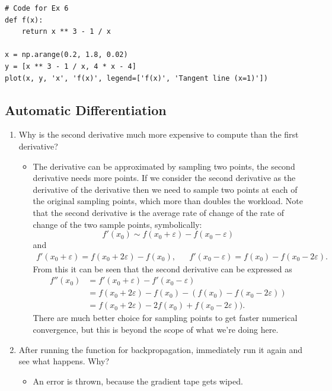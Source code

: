 \documentclass{article}
\begin{document}
\begin{verbatim}
# Code for Ex 6
def f(x):
    return x ** 3 - 1 / x

x = np.arange(0.2, 1.8, 0.02)
y = [x ** 3 - 1 / x, 4 * x - 4]
plot(x, y, 'x', 'f(x)', legend=['f(x)', 'Tangent line (x=1)'])
\end{verbatim}

\subsection{Automatic Differentiation}
\begin{enumerate}
\item Why is the second derivative much more expensive to compute than the first derivative?
	\begin{itemize}
		\item The derivative can be approximated by sampling two points, the second derivative needs more points. If we consider the second derivative as the derivative of the derivative then we need to sample two points at each of the original sampling points, which more than doubles the workload. Note that the second derivative is the average rate of change of the rate of change of the two sample points, symbolically:
		$$
		f'(x_0) \sim f(x_0 + \varepsilon) - f(x_0 - \varepsilon)
		$$
		and
		\begin{align*}
		f'(x_0 + \varepsilon) = f(x_0 + 2\varepsilon) - f(x_0),&&f'(x_0 - \varepsilon) = f(x_0) - f(x_0 - 2\varepsilon).
		\end{align*}
		From this it can be seen that the second derivative can be expressed as
		\begin{align*}
		f''(x_0) &= f'(x_0 + \varepsilon) - f'(x_0 - \varepsilon) \\
		&= f(x_0 + 2\varepsilon) - f(x_0) - (f(x_0) - f(x_0 - 2\varepsilon)) \\
		&= f(x_0 + 2\varepsilon) - 2f(x_0) + f(x_0 - 2\varepsilon)).
		\end{align*}
		There are much better choice for sampling points to get faster numerical convergence, but this is beyond the scope of what we're doing here. 
	\end{itemize}
\item After running the function for backpropagation, immediately run it again and see what happens. Why?
	\begin{itemize}
		\item An error is thrown, because the gradient tape gets wiped.
	\end{itemize}

\end{enumerate}
\end{document}
